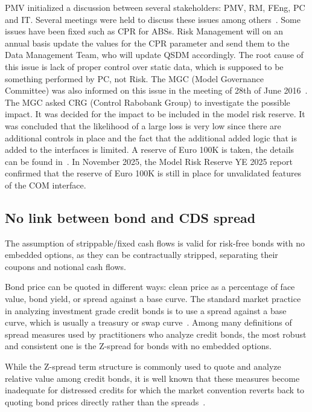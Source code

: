\documentclass[reviewdoc]{pmv_report}  %
\begin{document}
PMV initialized a discussion between several stakeholders: PMV, RM, FEng, PC and IT.
Several meetings were held to discuss these issues among others~\cite{MinutesBondMeetingsQuark}.
Some issues have been fixed such as CPR for ABSs.
Risk Management will on an annual basis update the values for the CPR parameter and send them to the Data Management Team, who will update QSDM accordingly.
The root cause of this issue is lack of proper control over static data, which is supposed to be something performed by PC, not Risk.
The MGC (Model Governance Committee) was also informed on this issue in the meeting of 28th of June 2016~\cite{MinutesMGC20160628}. The MGC asked CRG (Control Rabobank Group) to investigate the possible impact.
It was decided for the impact to be included in the model risk reserve.
It was concluded that the likelihood of a large loss is very low since there are additional controls in place and the fact that the additional added logic that is added to the interfaces is limited.
A reserve of Euro 100K is taken, the details can be found in~\cite{ModelRiskReserve20221206}.
In November 2025, the Model Risk Reserve YE 2025 report confirmed that the reserve of Euro 100K is still in place for unvalidated features of the COM interface.

\subsection{No link between bond and CDS spread}

The assumption of strippable/fixed cash flows is valid for risk-free bonds with no embedded options, as they can be contractually stripped, separating their coupons and notional cash flows.

Bond price can be quoted in different ways: clean price as a percentage of face value, bond yield, or spread against a base curve.
The standard market practice in analyzing investment grade credit bonds is to use a spread against a base curve, which is usually a treasury or swap curve~\cite{Berd09}.
Among many definitions of spread measures used by practitioners who analyze credit bonds, the most robust and consistent one is the Z-spread for bonds with no embedded options.

While the Z-spread term structure is commonly used to quote and analyze relative value among credit bonds, it is well known that these measures become inadequate for distressed credits for which the market convention reverts back
to quoting bond prices directly rather than the spreads~\cite{Berd09}.
\end{document}
